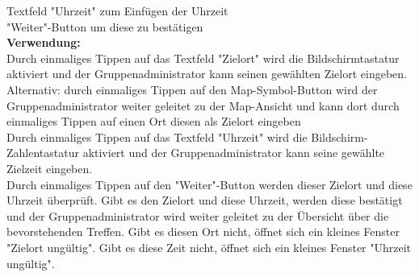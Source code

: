 Textfeld "Uhrzeit" zum Einfügen der Uhrzeit\\
"Weiter"-Button um diese zu bestätigen\\
\textbf{Verwendung:}\\
Durch einmaliges Tippen auf das Textfeld "Zielort" wird die Bildschirmtastatur aktiviert und der Gruppenadministrator kann seinen gewählten Zielort eingeben.\\
Alternativ: durch einmaliges Tippen auf den Map-Symbol-Button wird der Gruppenadministrator weiter geleitet zu der Map-Ansicht und kann dort durch einmaliges Tippen auf einen Ort diesen als Zielort eingeben\\
Durch einmaliges Tippen auf das Textfeld "Uhrzeit" wird die Bildschirm-Zahlentastatur aktiviert und der Gruppenadministrator kann seine gewählte Zielzeit eingeben.\\
Durch einmaliges Tippen auf den "Weiter"-Button werden dieser Zielort und diese Uhrzeit überprüft. Gibt es den Zielort und diese Uhrzeit, werden diese bestätigt und der Gruppenadministrator wird weiter geleitet zu der Übersicht über die bevorstehenden Treffen. Gibt es diesen Ort nicht, öffnet sich ein kleines Fenster "Zielort ungültig". Gibt es diese Zeit nicht, öffnet sich ein kleines Fenster "Uhrzeit ungültig".\\ \\

